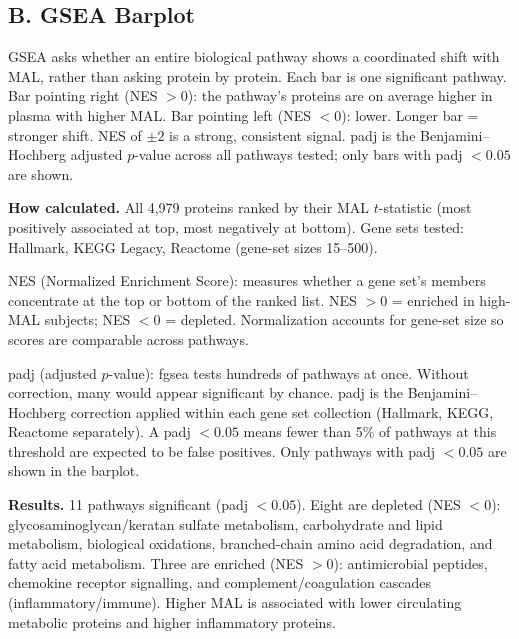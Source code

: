 \documentclass[11pt, letterpaper]{article}
\begin{document}
\subsection*{B. GSEA Barplot}

GSEA asks whether an entire biological pathway shows a coordinated shift
with MAL, rather than asking protein by protein. Each bar is one
significant pathway. Bar pointing right (NES $> 0$): the pathway's
proteins are on average higher in plasma with higher MAL. Bar pointing
left (NES $< 0$): lower. Longer bar = stronger shift. NES of $\pm 2$
is a strong, consistent signal. padj is the Benjamini--Hochberg
adjusted $p$-value across all pathways tested; only bars with padj $<
0.05$ are shown.

\textbf{How calculated.}
All 4,979 proteins ranked by their MAL $t$-statistic (most positively
associated at top, most negatively at bottom). Gene sets tested:
Hallmark, KEGG Legacy, Reactome (gene-set sizes 15--500).

NES (Normalized Enrichment Score): measures whether a gene set's
members concentrate at the top or bottom of the ranked list.
NES $> 0$ = enriched in high-MAL subjects; NES $< 0$ = depleted.
Normalization accounts for gene-set size so scores are comparable
across pathways.

padj (adjusted $p$-value): fgsea tests hundreds of pathways at once.
Without correction, many would appear significant by chance. padj is
the Benjamini--Hochberg correction applied within each gene set
collection (Hallmark, KEGG, Reactome separately). A padj $< 0.05$
means fewer than 5\% of pathways at this threshold are expected to be
false positives. Only pathways with padj $< 0.05$ are shown in the
barplot.

\textbf{Results.} 11 pathways significant (padj $< 0.05$). Eight are
depleted (NES $< 0$): glycosaminoglycan/keratan sulfate metabolism,
carbohydrate and lipid metabolism, biological oxidations,
branched-chain amino acid degradation, and fatty acid metabolism.
Three are enriched (NES $> 0$): antimicrobial peptides, chemokine
receptor signalling, and complement/coagulation cascades
(inflammatory/immune). Higher MAL is associated with lower
circulating metabolic proteins and higher inflammatory proteins.
\end{document}
